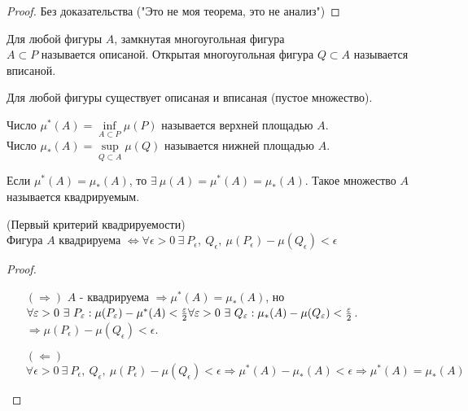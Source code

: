 \begin{proof}
    Без доказательства ("Это не моя теорема, это не анализ")
\end{proof} 
\begin{definition}
    Для любой фигуры $A$, замкнутая многоугольная фигура\\
    $A\subset P$ называется описаной. Открытая многоугольная фигура $Q\subset A$ называется вписаной.
\end{definition} 
\begin{comm}
    Для любой фигуры существует описаная и вписаная (пустое множество).
\end{comm} 
\begin{definition}
    Число $\mu^*(A)=\inf\limits_{A\subset P}\mu(P)$ называется верхней площадью $A$.\\
    Число $\mu_*(A)=\sup\limits_{Q\subset A}\mu(Q)$ называется нижней площадью $A$.
\end{definition} 
\begin{definition}
    Если $\mu^*(A)=\mu_*(A)$, то $\exists\ \mu(A)=\mu^*(A)=\mu_*(A)$. Такое множество $A$ называется квадрируемым.
\end{definition} 
\begin{theorem}
    (Первый критерий квадрируемости)\\
    Фигура $A$ квадрируема $\Leftrightarrow \forall \epsilon>0\ \exists\ P_{\epsilon},\ Q_{\epsilon},\ \mu(P_{\epsilon})-\mu(Q_{\epsilon})<\epsilon$
\end{theorem} 
\begin{proof}
    \begin{itemize}
        \item[$(\Rightarrow)$] $A$ - квадрируема $\Rightarrow \mu^*(A)=\mu_*(A)$, но \\
        $\forall \epsilon>0\ \exists\ P_{\epsilon}: \mu(P_{\epsilon})-\mu^*(A)<\frac{\epsilon}{2}\\ 
        \forall \epsilon>0\ \exists\ Q_{\epsilon}: \mu_*(A)-\mu(Q_{\epsilon})<\frac{\epsilon}{2}$.
        $\Rightarrow \mu(P_\epsilon)-\mu(Q_{\epsilon})<\epsilon$.
        \item[$(\Leftarrow)$] $\forall \epsilon>0\ \exists\ P_{\epsilon},\ Q_{\epsilon},\ \mu(P_{\epsilon})-\mu(Q_{\epsilon})<\epsilon \Rightarrow \mu^*(A)-\mu_*(A)<\epsilon \Rightarrow \mu^*(A)=\mu_*(A)$
    \end{itemize}
\end{proof} 
